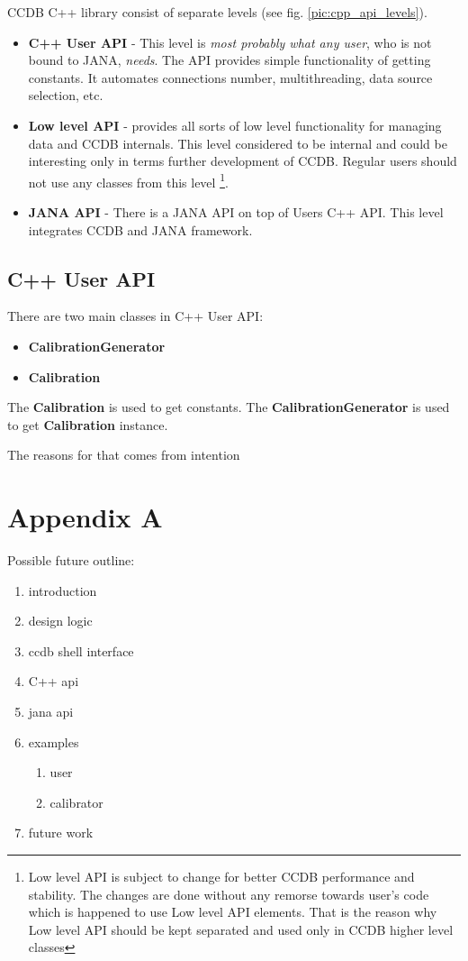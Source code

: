 \documentclass{article}
\begin{document}
CCDB C++ library consist of separate levels (see fig. \ref{pic:cpp_api_levels}).
\begin{itemize}
\item \textbf{C++ User API} - This level is \textit{most probably what any user},
      who is not bound to JANA, \textit{needs}. The API provides simple
      functionality of getting  constants. It automates connections number,
      multithreading, data source selection, etc.

\item \textbf{Low level API} - provides all sorts of low level functionality for
       managing data and CCDB internals. This level considered to be internal
       and could be interesting only in terms further development of CCDB.
       Regular users should not use any classes from this level
       \footnote{Low level API is subject to change for better CCDB performance
                 and stability. The changes are done without any
                 remorse towards user's code which is happened to use Low
                 level API elements. That is the reason why Low level API
                 should be kept separated and used only in CCDB higher level
                 classes}.

\item \textbf{JANA API} - There is a JANA API on top of Users C++ API. This
      level integrates CCDB and JANA framework.
\end{itemize}


\subsection{C++ User API}

There are two main classes in C++ User API:

\begin{itemize}
  \item \textbf{CalibrationGenerator}
  \item \textbf{Calibration}
\end{itemize}
The \textbf{Calibration} is used to get constants.
The \textbf{CalibrationGenerator} is used to get \textbf{Calibration} instance.




The reasons for that comes from intention


\section{Appendix A}

Possible future outline:

\begin{enumerate}
\item introduction
\item design logic
\item ccdb shell interface
\item C++ api
\item jana api
\item examples
  \begin{enumerate}
  \item user
  \item calibrator
  \end{enumerate}
\item future work
\end{enumerate}
\end{document}
